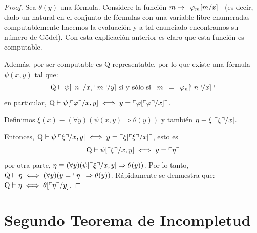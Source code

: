 \documentclass[12pt]{report}
\newcounter{it}
\theoremstyle{largebreak}
\begin{document}
    \begin{proof}
        Sea $\theta(y)$ una fórmula. Considere la función $m\mapsto\ulcorner\varphi_m[m/x]\urcorner$ (es decir, dado un natural en el conjunto de fórmulas con una variable libre enumeradas computablemente hacemos la evaluación y a tal enunciado encontramos su número de Gödel). Con esta explicación anterior es claro que esta función es computable.

        Además, por ser computable es Q-representable, por lo que existe una fórmula $\psi(x,y)$ tal que:
        \begin{equation*}
            \textup{Q}\vdash\psi[\ulcorner n\urcorner/x,\ulcorner m\urcorner/y]\textup{ si y sólo si }\ulcorner m\urcorner=\ulcorner\varphi_n[\ulcorner n\urcorner/x]\urcorner
        \end{equation*}
        en particular, $\textup{Q}\vdash\psi[\ulcorner\varphi\urcorner/x,y]\iff y=\ulcorner\varphi[\ulcorner\varphi\urcorner/x]\urcorner$.

        Definimos $\xi(x)\equiv(\forall y)(\psi(x,y)\Rightarrow\theta(y))$ y también $\eta\equiv\xi[\ulcorner\xi\urcorner/x]$.

        Entonces, $\textup{Q}\vdash\psi[\ulcorner\xi\urcorner/x,y]\iff y=\ulcorner\xi[\ulcorner\xi\urcorner/x]\urcorner$, esto es
        \begin{equation*}
            \begin{split}
                \textup{Q}&\vdash\psi[\ulcorner\xi\urcorner/x,y]\iff y=\ulcorner\eta\urcorner\\
            \end{split}
        \end{equation*}
        por otra parte, $\eta\equiv(\forall y)(\psi[\ulcorner\xi\urcorner/x,y]\Rightarrow\theta(y))$. Por lo tanto, $\textup{Q}\vdash\eta\iff(\forall y)(y=\ulcorner\eta\urcorner\Rightarrow\theta(y))$. Rápidamente se demuestra que: $\textup{Q}\vdash\eta\iff\theta[\ulcorner\eta\urcorner/y]$.
    \end{proof}

    \section{Segundo Teorema de Incompletud}
\end{document}
